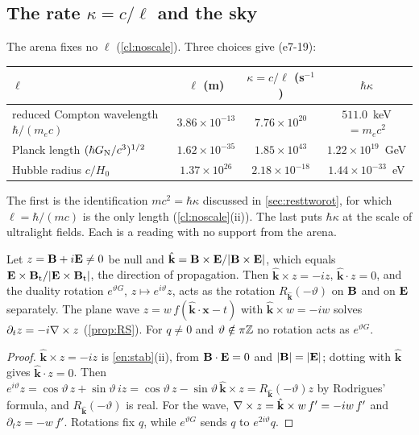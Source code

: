 \subsection{\texorpdfstring{The rate $\kappa=c/\ell$ and the sky}{The rate kappa = c/l and the sky}}
\label{e7:sec:rate}

The arena fixes no $\ell$ (\cref{cl:noscale}). Three choices give (e7-19):
\begin{center}
\small
\begin{tabular}{@{}lccc@{}}
\toprule
$\ell$ & $\ell$ (m) & $\kappa=c/\ell$ (s$^{-1}$) & $\hbar\kappa$\\
\midrule
reduced Compton wavelength $\hbar/(m_ec)$ & $3.86\times10^{-13}$ & $7.76\times10^{20}$ & $511.0$~keV $=m_ec^2$\\
Planck length $(\hbar G_{\rm N}/c^3)^{1/2}$ & $1.62\times10^{-35}$ & $1.85\times10^{43}$ & $1.22\times10^{19}$~GeV\\
Hubble radius $c/H_0$ \cite{Planck18VI} & $1.37\times10^{26}$ & $2.18\times10^{-18}$ & $1.44\times10^{-33}$~eV\\
\bottomrule
\end{tabular}
\end{center}
The first is the identification $mc^2=\hbar\kappa$ discussed in \cref{sec:resttworot}, for which $\ell=\hbar/(mc)$ is the only length (\cref{cl:noscale}(ii)). The
last puts $\hbar\kappa$ at the scale of ultralight fields. Each is a reading with no support from the arena.

\begin{proposition}
\label{e7:prop:dualrot}
Let $z=\mathbf B+i\mathbf E\neq0$ be null and $\hat{\mathbf k}=\mathbf B\times\mathbf E/|\mathbf B\times\mathbf E|$, which equals $\mathbf E\times\mathbf B_{\rm t}/|\mathbf E\times\mathbf B_{\rm t}|$, the direction of
propagation. Then $\hat{\mathbf k}\times z=-iz$, $\hat{\mathbf k}\cdot z=0$, and the duality rotation $e^{\vartheta G}$, $z\mapsto e^{i\vartheta}z$, acts as the
rotation $R_{\hat{\mathbf k}}(-\vartheta)$ on $\mathbf B$ and on $\mathbf E$ separately. The plane wave $z=w\,f(\hat{\mathbf k}\cdot\mathbf x-t)$ with $\hat{\mathbf k}\times w=-iw$
solves $\partial_tz=-i\nabla\times z$ (\cref{prop:RS}). For $q\neq0$ and $\vartheta\notin\pi\mathbb{Z}$ no rotation acts as $e^{\vartheta G}$.
\end{proposition}

\begin{proof}
$\hat{\mathbf k}\times z=-iz$ is \cref{en:stab}(ii), from $\mathbf B\cdot\mathbf E=0$ and $|\mathbf B|=|\mathbf E|$; dotting with $\hat{\mathbf k}$ gives $\hat{\mathbf k}\cdot z=0$. Then
$e^{i\vartheta}z=\cos\vartheta\,z+\sin\vartheta\,iz=\cos\vartheta\,z-\sin\vartheta\,\hat{\mathbf k}\times z=R_{\hat{\mathbf k}}(-\vartheta)z$ by Rodrigues' formula,
and $R_{\hat{\mathbf k}}(-\vartheta)$ is real. For the wave, $\nabla\times z=\hat{\mathbf k}\times w\,f'=-iw\,f'$ and $\partial_tz=-w\,f'$. Rotations fix $q$, while
$e^{\vartheta G}$ sends $q$ to $e^{2i\vartheta}q$.
\end{proof}

